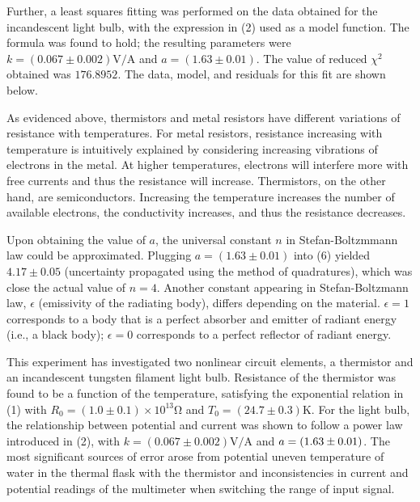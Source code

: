 \begin{paper}
	Further, a least squares fitting was performed on the data obtained for the incandescent light bulb, with the expression in (2) used as a model function. The formula was found to hold; the resulting parameters were \( k =  (0.067 \pm 0.002) \si{\volt\per\ampere} \) and \( a = (1.63 \pm 0.01) \). The value of reduced \( \chi ^ 2 \) obtained was \( 176.8952 \). The data, model, and residuals for this fit are shown below.

	 \vspace{1em}
	
	As evidenced above, thermistors and metal resistors have different variations of resistance with temperatures. For metal resistors, resistance increasing with temperature is intuitively explained by considering increasing vibrations of electrons in the metal. At higher temperatures, electrons will interfere more with free currents and thus the resistance will increase. Thermistors, on the other hand, are semiconductors. Increasing the temperature increases the number of available electrons, the conductivity increases, and thus the resistance decreases.
	
	Upon obtaining the value of \( a \), the universal constant \( n \) in Stefan-Boltzmmann law could be approximated. Plugging \( a = (1.63 \pm 0.01) \) into (6) yielded \( 4.17 \pm 0.05 \) (uncertainty propagated using the method  of quadratures), which was close the actual value of \( n = 4\). Another constant appearing in Stefan-Boltzmann law, \( \epsilon \) (emissivity of the radiating body), differs depending on the material. \( \epsilon = 1 \) corresponds to a body that is a perfect absorber and emitter of radiant energy (i.e., a black body); \( \epsilon = 0 \) corresponds to a perfect reflector of radiant energy. 
	

		This experiment has investigated two nonlinear circuit elements, a thermistor and an incandescent tungsten filament light bulb. Resistance of the thermistor was found to be a function of the temperature, satisfying the exponential relation in (1) with \( R_0 = (1.0 \pm 0.1) \times 10^{13} \si{\ohm} \) and \( T_0 = (24.7 \pm 0.3) \si{\kelvin} \).  For the light bulb, the relationship between potential and current was shown to follow a power law introduced in (2), with \( k =  (0.067 \pm 0.002) \si{\volt\per\ampere} \) and \( a = \left(1.63 \pm 0.01\right) \). The most significant sources of error arose from potential uneven temperature of water in the thermal flask with the thermistor and inconsistencies in current and potential readings of the multimeter when switching the range of input signal. 
		

\end{paper}
